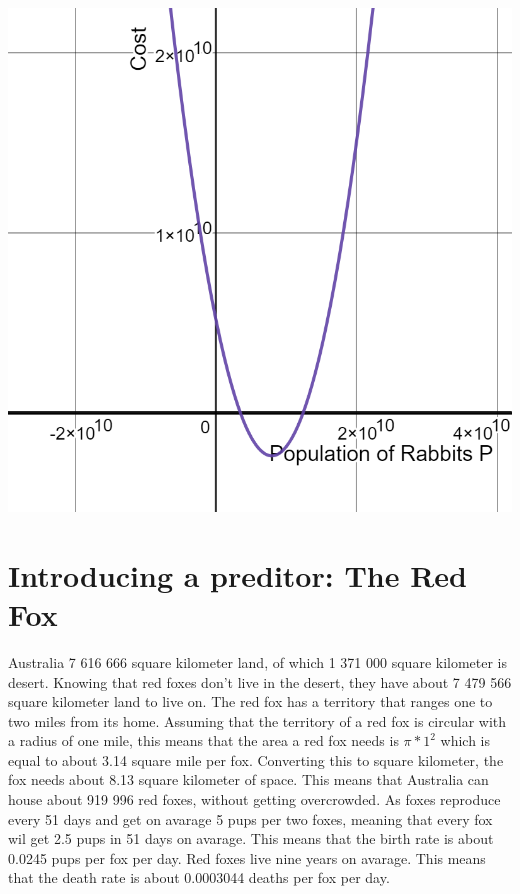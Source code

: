 \documentclass{article}
\begin{document}
\includegraphics[scale=0.3]{Pictures/CostH}
\\



\section{Introducing a preditor: The Red Fox}
Australia 7 616 666 square kilometer land, of which 1 371 000 square kilometer is desert. Knowing that red foxes don't live in the desert, they have about 7 479 566 square kilometer land to live on. The red fox has a territory that ranges one to two miles from its home. Assuming that the territory of a red fox is circular with a radius of one mile, this means that the area a red fox needs is $\pi*1^2$ which is equal to about 3.14 square mile per fox.\cite{FoxTerritoryReproduction} Converting this to square kilometer, the fox needs about 8.13 square kilometer of space. This means that Australia can house about 919 996 red foxes, without getting overcrowded. As foxes reproduce every 51 days and get on avarage 5 pups per two foxes, meaning that every fox wil get 2.5 pups in 51 days on avarage.\cite{FoxTerritoryReproduction} This means that the birth rate is about 0.0245 pups per fox per day. Red foxes live nine years on avarage.\cite{FoxLife} This means that the death rate is about 0.0003044 deaths per fox per day.
\end{document}
